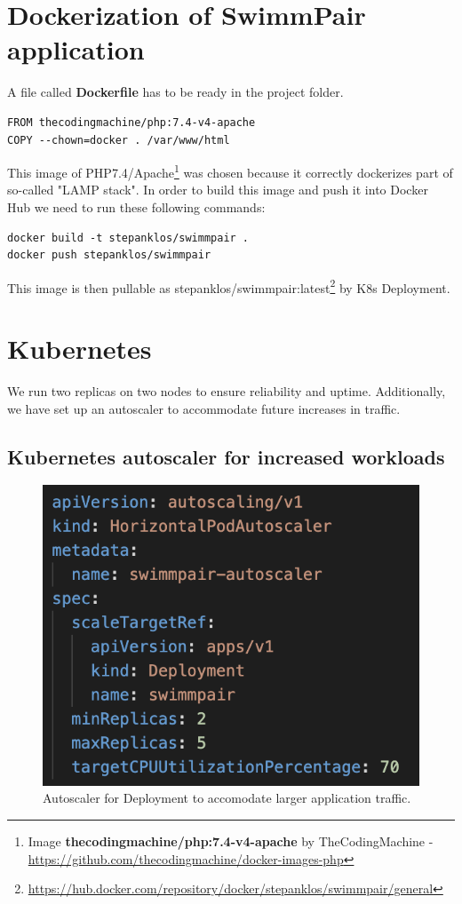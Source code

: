 \section*{Dockerization of SwimmPair application}
A file called \textbf{Dockerfile} has to be ready in the project folder.
\begin{lstlisting}
FROM thecodingmachine/php:7.4-v4-apache
COPY --chown=docker . /var/www/html
\end{lstlisting}
This image of PHP7.4/Apache\footnote{Image \textbf{thecodingmachine/php:7.4-v4-apache}  by TheCodingMachine - \url{https://github.com/thecodingmachine/docker-images-php}} was chosen because it correctly dockerizes part of so-called "LAMP stack". In order to build this image and push it into Docker Hub we need to run these following commands:
\begin{lstlisting}
docker build -t stepanklos/swimmpair .
docker push stepanklos/swimmpair
\end{lstlisting}
This image is then pullable as stepanklos/swimmpair:latest\footnote{\url{https://hub.docker.com/repository/docker/stepanklos/swimmpair/general}} by K8s Deployment.
\section*{Kubernetes}
We run two replicas on two nodes to ensure reliability and uptime. Additionally, we have set up an autoscaler to accommodate future increases in traffic.
\subsection*{Kubernetes autoscaler for increased workloads}
\begin{figure}[h]
    \centering	
    \includegraphics[scale=0.52]{img/swimmpair_deloyment_k8s_scaling.png}
    \caption{Autoscaler for Deployment to accomodate larger application traffic.}
    \label{fig5.2:k8sautoscaling}
\end{figure}
